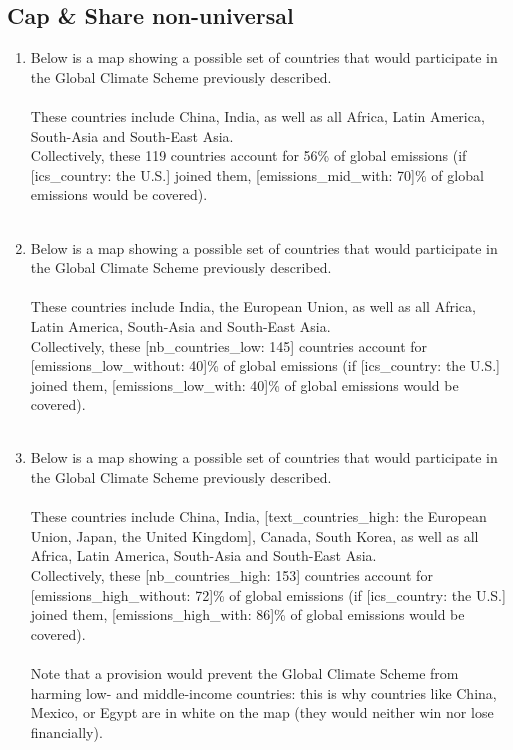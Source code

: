  \subsection*{Cap & Share non-universal } 
 \begin{enumerate}[resume] 
\item  \label{q:gcs_mid} Below is a map showing a possible set of countries that would participate in the Global Climate Scheme previously described.\\
\\
These countries include China, India, as well as all Africa, Latin America, South-Asia and South-East Asia.\\
Collectively, these 119 countries account for 56\% of global emissions (if [ics\_country: the U.S.] joined them, [emissions\_mid\_with: 70]\% of global emissions would be covered).\\
\\ [\textit{Figure \ref{fig:gcs_mid}}; 
\verb|gcs_mid|]


\item  \label{q:gcs_low} Below is a map showing a possible set of countries that would participate in the Global Climate Scheme previously described.\\
\\
These countries include India, the European Union, as well as all Africa, Latin America, South-Asia and South-East Asia.\\
Collectively, these [nb\_countries\_low: 145] countries account for [emissions\_low\_without: 40]\% of global emissions (if [ics\_country: the U.S.] joined them, [emissions\_low\_with: 40]\% of global emissions would be covered).\\
\\ [\textit{Figure \ref{fig:gcs_low}}; 
\verb|gcs_low|]


\item  \label{q:gcs_high_color} Below is a map showing a possible set of countries that would participate in the Global Climate Scheme previously described.\\
\\
These countries include China, India, [text\_countries\_high: the European Union, Japan, the United Kingdom], Canada, South Korea, as well as all Africa, Latin America, South-Asia and South-East Asia. \\
Collectively, these [nb\_countries\_high: 153] countries account for [emissions\_high\_without: 72]\% of global emissions (if [ics\_country: the U.S.] joined them, [emissions\_high\_with: 86]\% of global emissions would be covered).\\\\Note that a provision would prevent the Global Climate Scheme from harming low- and middle-income countries: this is why countries like China, Mexico, or Egypt are in white on the map (they would neither win nor lose financially).\\
\\ [\textit{Figure \ref{fig:gcs_high_color}}; 
\verb|gcs_high_color|]



\end{enumerate}
